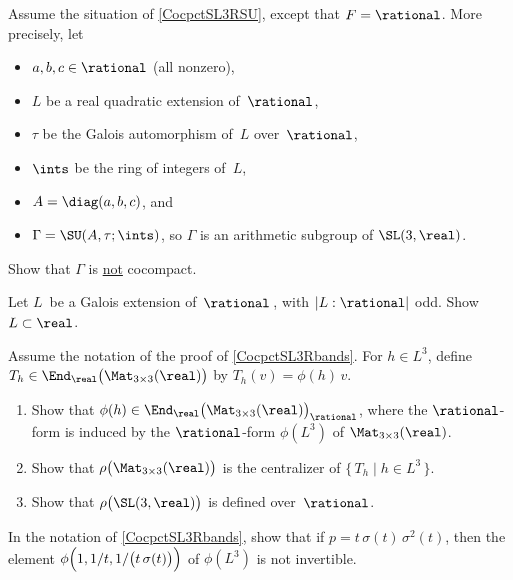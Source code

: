 \begin{exercises}

\item \label{SU3NotCocpct}
Assume the situation of \cref{CocpctSL3RSU}, except that $F = \rational$.
More precisely, let 
	\begin{itemize}
	\item $a,b,c \in \rational$ (all nonzero),
	\item $L$ be a real quadratic extension of~$\rational$,
	\item $\tau$ be the Galois automorphism of~$L$ over~$\rational$,
	\item $\ints$ be the ring of integers of~$L$,
	\item $A = \diag( a,b,c )$,
	and
	\item $\Gamma = \SU ( A, \tau ; \ints )$, so $\Gamma$ is an arithmetic subgroup of\/ $\SL(3,\real)$.
	\end{itemize}
Show that $\Gamma$ is \underline{not} cocompact.

\item \label{L/Qodd->LinR}
 Let $L$~be a Galois extension of~$\rational$\,,
with $|L:\rational|$ odd. Show $L \subset \real$.

\item \label{CocpctSL3RbandsEx/Q}
 Assume the notation of the proof of
\cref{CocpctSL3Rbands}. For $h \in L^3$, define $T_h
\in \End_{\real} \bigl( \Mat_{3 \times 3}(\real) \bigr)$ by
$T_h(v) = \phi(h) \, v$.
 \begin{enumerate}
 \item Show that $\phi(h) \in \End_{\real} \bigl( \Mat_{3
\times 3}(\real) \bigr)_{\rational}$, where the $\rational$-form is  induced by the $\rational$-form
$\phi(L^3)$ of $\Mat_{3 \times 3}(\real)$. 
 \item Show that $\rho \bigl( \Mat_{3 \times 3}(\real)
\bigr)$ is the centralizer of $\{\, T_h \mid h \in L^3
\,\}$.
 \item Show that $\rho \bigl( \SL(3,\real) \bigr)$ is
defined over~$\rational$.
 \end{enumerate}

\item In the notation of \cref{CocpctSL3Rbands}, show
that if $p = t \, \sigma(t) \, \sigma^2(t)$, then the element 
$\phi\Bigl( 1,1/t, 1/ \bigl(t \, \sigma(t) \bigr) \Bigr)$ of $\phi(L^3)$ is not invertible.


\end{exercises}
